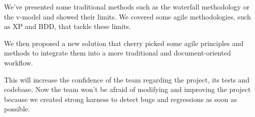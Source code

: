 We've presented some traditional methods such as the waterfall methodology or
the v-model and showed their limits.
We covered some agile methodologies, such as XP and BDD, that tackle these
limits.

We then proposed a new solution that cherry picked some agile principles and
methods to integrate them into a more traditional and document-oriented
workflow.

This will increase the confidence of the team regarding the project, its
tests and codebase.
Now the team won't be afraid of modifying and improving the project because
we created strong harness to detect bugs and regressions as soon as possible.